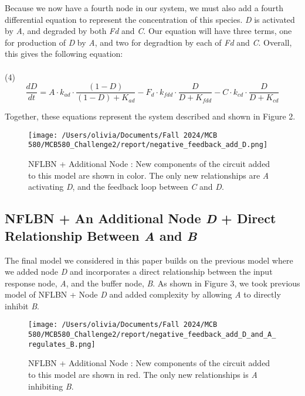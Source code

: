 \documentclass{article}
\begin{document}
Because we now have a fourth node in our system, we must also add a fourth differential equation to represent the concentration of this species. \textit{D} is activated by \textit{A}, and degraded by both \textit{Fd} and \textit{C}. Our equation will have three terms, one for production of \textit{D} by \textit{A}, and two for degradtion by each of \textit{Fd} and \textit{C}. Overall, this gives the following equation:
\\
\\
(4)
\[
\frac{dD}{dt} = A \cdot k_{ad} \cdot \frac{(1 - D)}{(1 - D) + K_{ad}} - F_d \cdot k_{fdd} \cdot \frac{D}{D + K_{fdd}} - C \cdot k_{cd} \cdot \frac{D}{D + K_{cd}}
\]

Together, these equations represent the system described and shown in Figure 2. 

\begin{figure}[H]
    \centering
    \texttt{[image: /Users/olivia/Documents/Fall 2024/MCB 580/MCB580\_Challenge2/report/negative\_feedback\_add\_D.png]}
    \caption{NFLBN + Additional Node : New components of the circuit added to this model are shown in color. The only new relationships are \textit{A} activating \textit{D}, and the feedback loop between \textit{C} and \textit{D}.}
    \label{fig:2}
\end{figure}

\subsection{NFLBN + An Additional Node \textit{D} + Direct Relationship Between \textit{A} and \textit{B}}

The final model we considered in this paper builds on the previous model where we added node \textit{D} and incorporates a direct relationship between the input response node, \textit{A}, and the buffer node, \textit{B}. As shown in Figure 3, we took previous model of NFLBN + Node \textit{D} and added complexity by allowing \textit{A} to directly inhibit \textit{B}. 

\begin{figure}[H]
    \centering
    \texttt{[image: /Users/olivia/Documents/Fall 2024/MCB 580/MCB580\_Challenge2/report/negative\_feedback\_add\_D\_and\_A\_regulates\_B.png]}
    \caption{NFLBN + Additional Node : New components of the circuit added to this model are shown in red. The only new relationships is \textit{A} inhibiting \textit{B}.}
    \label{fig:3}
\end{figure}
\end{document}
